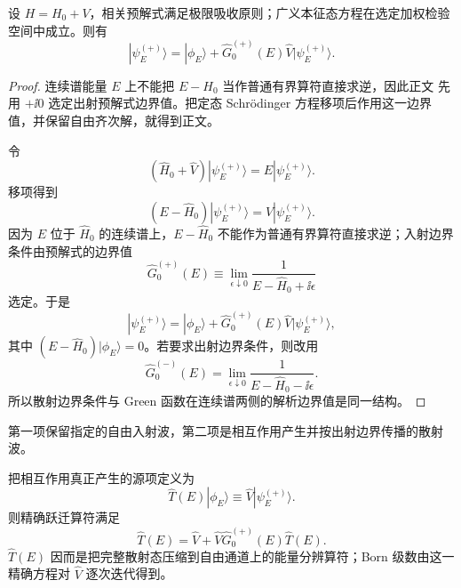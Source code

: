 \begin{proposition}[预解式构造的散射边界值方程]
设 $H=H_0+V$，相关预解式满足极限吸收原则；广义本征态方程在选定加权检验空间中成立。则有
\begin{equation}
 {
 |\psi_E^{(+)}\rangle
 =
 |\phi_E\rangle
 +\hat G_0^{(+)}(E)\hat V
 |\psi_E^{(+)}\rangle.}
\label{eq:LS-state-r5}
\end{equation}
\end{proposition}
\begin{proof}
连续谱能量 $E$ 上不能把 $E-H_0$ 当作普通有界算符直接求逆，因此正文 先用 $+\ii0$ 选定出射预解式边界值。把定态 Schrödinger 方程移项后作用这一边界值，并保留自由齐次解，就得到正文。



令
\begin{equation*}
 (\hat H_0+\hat V)|\psi_E^{(+)}\rangle
 =E|\psi_E^{(+)}\rangle.
\end{equation*}
移项得到
\begin{equation*}
 (E-\hat H_0)|\psi_E^{(+)}\rangle
 =\hat V|\psi_E^{(+)}\rangle.
\end{equation*}
因为 $E$ 位于 $\hat H_0$ 的连续谱上，$E-\hat H_0$ 不能作为普通有界算符直接求逆；入射边界条件由预解式的边界值
\begin{equation*}
 \hat G_0^{(+)}(E)
 \equiv
 \lim_{\epsilon\downarrow0}
 \frac{1}{E-\hat H_0+\ii\epsilon}
 \end{equation*}
选定。于是
\begin{equation*}
 {
 |\psi_E^{(+)}\rangle
 =
 |\phi_E\rangle
 +\hat G_0^{(+)}(E)\hat V
 |\psi_E^{(+)}\rangle,}
 \end{equation*}
其中 $(E-\hat H_0)|\phi_E\rangle=0$。若要求出射边界条件，则改用
\begin{equation*}
 \hat G_0^{(-)}(E)
 =
 \lim_{\epsilon\downarrow0}
 \frac{1}{E-\hat H_0-\ii\epsilon}.
\end{equation*}
所以散射边界条件与 Green 函数在连续谱两侧的解析边界值是同一结构。
\end{proof}

第一项保留指定的自由入射波，第二项是相互作用产生并按出射边界传播的散射波。

把相互作用真正产生的源项定义为
\begin{equation}
 \hat T(E)|\phi_E\rangle
 \equiv
 \hat V|\psi_E^{(+)}\rangle.
 \label{eq:T-def-r5}
\end{equation}
则精确跃迁算符满足
\begin{equation}
 {
 \hat T(E)
 =
 \hat V+\hat V\hat G_0^{(+)}(E)\hat T(E).}
 \label{eq:T-exact-r5}
\end{equation}
$\hat T(E)$ 因而是把完整散射态压缩到自由通道上的能量分辨算符；Born 级数由这一精确方程对 $\hat V$ 逐次迭代得到。

